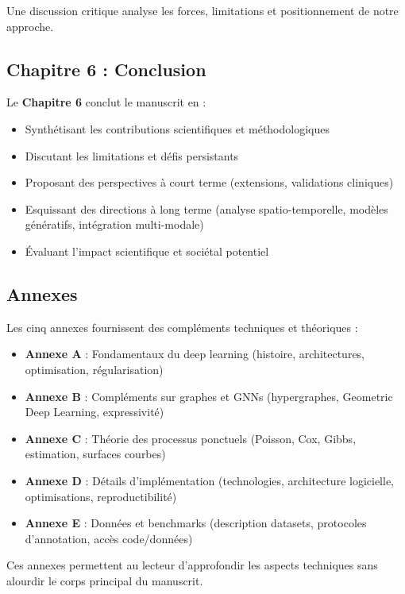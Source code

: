 Une discussion critique analyse les forces, limitations et positionnement de notre approche.

\subsection{Chapitre 6 : Conclusion}

Le \textbf{Chapitre 6} conclut le manuscrit en :
\begin{itemize}
    \item Synthétisant les contributions scientifiques et méthodologiques
    \item Discutant les limitations et défis persistants
    \item Proposant des perspectives à court terme (extensions, validations cliniques)
    \item Esquissant des directions à long terme (analyse spatio-temporelle, modèles génératifs, intégration multi-modale)
    \item Évaluant l'impact scientifique et sociétal potentiel
\end{itemize}

\subsection{Annexes}

Les cinq annexes fournissent des compléments techniques et théoriques :
\begin{itemize}
    \item \textbf{Annexe A} : Fondamentaux du deep learning (histoire, architectures, optimisation, régularisation)
    \item \textbf{Annexe B} : Compléments sur graphes et GNNs (hypergraphes, Geometric Deep Learning, expressivité)
    \item \textbf{Annexe C} : Théorie des processus ponctuels (Poisson, Cox, Gibbs, estimation, surfaces courbes)
    \item \textbf{Annexe D} : Détails d'implémentation (technologies, architecture logicielle, optimisations, reproductibilité)
    \item \textbf{Annexe E} : Données et benchmarks (description datasets, protocoles d'annotation, accès code/données)
\end{itemize}

Ces annexes permettent au lecteur d'approfondir les aspects techniques sans alourdir le corps principal du manuscrit.
